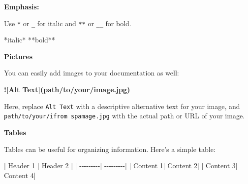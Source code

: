 \documentclass[
  letterpaper,
  DIV=11,
  numbers=noendperiod]{scrreprt}
\newenvironment{Shaded}{}{}
\newcommand{\AlertTok}[1]{\textcolor[rgb]{1.00,0.33,0.33}{\textbf{#1}}}
\newcommand{\NormalTok}[1]{\textcolor[rgb]{0.14,0.16,0.18}{#1}}
\begin{document}
\textbf{Emphasis:}

Use \texttt{*} or \texttt{\_} for italic and \texttt{**} or
\texttt{\_\_} for bold.

\begin{Shaded}
\begin{Highlighting}[]
\NormalTok{*italic*}
\NormalTok{**bold**}
\end{Highlighting}
\end{Shaded}

\textbf{Pictures}

You can easily add images to your documentation as well:

\begin{Shaded}
\begin{Highlighting}[]
\AlertTok{![Alt Text](path/to/your/image.jpg)}
\end{Highlighting}
\end{Shaded}

Here, replace \texttt{Alt\ Text} with a descriptive alternative text for
your image, and \texttt{path/to/your/ifrom\ spamage.jpg} with the actual
path or URL of your image.

\textbf{Tables}

Tables can be useful for organizing information. Here's a simple table:

\begin{Shaded}
\begin{Highlighting}[]
\NormalTok{| Header 1 | Header 2 |}
\NormalTok{| {-}{-}{-}{-}{-}{-}{-}{-}{-}| {-}{-}{-}{-}{-}{-}{-}{-}{-}|}
\NormalTok{| Content 1| Content 2|}
\NormalTok{| Content 3| Content 4|}
\end{Highlighting}
\end{Shaded}
\end{document}
